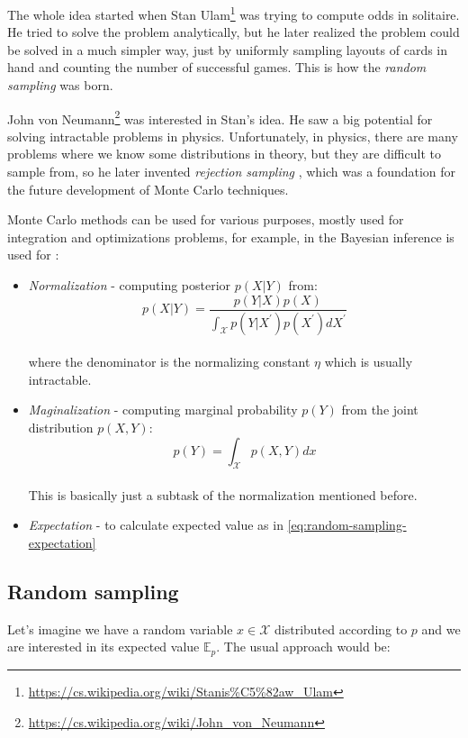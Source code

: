 \documentclass[
  digital, %
  oneside, %
  lof,     %
  lot,     %
]{fithesis4}
\begin{document}
The whole idea started when Stan Ulam\footnote{\url{https://cs.wikipedia.org/wiki/Stanis\%C5\%82aw_Ulam}} was trying to compute odds in solitaire.
He tried to solve the problem analytically, but he later realized the problem could be solved in a much simpler way, just by uniformly sampling layouts of cards in hand and counting the number of successful games.
This is how the \textit{random sampling} was born.

John von Neumann\footnote{\url{https://cs.wikipedia.org/wiki/John_von_Neumann}} was interested in Stan's idea. He saw a big potential for solving intractable problems in physics.
Unfortunately, in physics, there are many problems where we know some distributions in theory, but they are difficult to sample from, so he later invented \textit{rejection sampling} \cite{beichl2000}, which was a foundation for the future development of Monte Carlo techniques.

Monte Carlo methods can be used for various purposes, mostly used for integration and optimizations problems, for example, in the Bayesian inference is used for \cite{andrieu2003}:

\begin{itemize}
  \item \textit{Normalization} - computing posterior $p(X | Y)$ from:
    \begin{equation}
      p(X | Y) = \frac{p(Y | X) p(X)}{\int_{\mathcal{X}} p(Y | X^\prime) p(X^\prime) dX^\prime}
    \end{equation} \\
    where the denominator is the normalizing constant $\eta$ which is usually intractable.
  \item \textit{Maginalization} - computing marginal probability $p(Y)$ from the joint distribution $p(X, Y)$:
    \begin{equation}
      p(Y) = \int_{\mathcal{X}} p(X, Y) dx
    \end{equation} \\
    This is basically just a subtask of the normalization mentioned before.
  \item \textit{Expectation} - to calculate expected value as in \eqref{eq:random-sampling-expectation}
\end{itemize}


\subsection{Random sampling}

Let's imagine we have a random variable $x \in \mathcal{X}$ distributed according to $p$ and we are interested in its expected value $\mathbb{E}_p$.
The usual approach would be:
\end{document}
